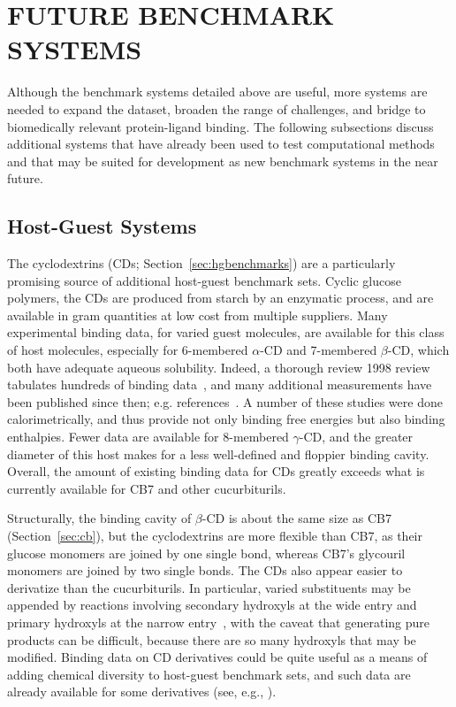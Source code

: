 \documentclass[aps,pre,twocolumn,nofootinbib,superscriptaddress,10pt, final,tightenlines]{revtex4-1}
\begin{document}
\section{FUTURE BENCHMARK SYSTEMS}
\label{sec:futuresystems}
Although the benchmark systems detailed above are useful, more systems are needed to expand the dataset, broaden the range of challenges, and bridge to biomedically relevant protein-ligand binding.
The following subsections discuss additional systems that have already been used to test computational methods and that may be suited for development as new benchmark systems in the near future.

\subsection{Host-Guest Systems}
The cyclodextrins (CDs; Section~\ref{sec:hgbenchmarks}) are a particularly promising source of additional host-guest benchmark sets.
Cyclic glucose polymers, the CDs are produced from starch by an enzymatic process, and are available in gram quantities at low cost from multiple suppliers. 
Many experimental binding data, for varied guest molecules, are available for this class of host molecules, especially for 6-membered $\alpha$-CD and 7-membered $\beta$-CD, which both have adequate aqueous solubility.
Indeed, a thorough review 1998 review tabulates hundreds of binding data~\cite{rekharsky_complexation_1998}, and many additional measurements have been published since then; e.g. references~\cite{Connors:1997:Chem.Rev., Carrazana:2005:J.Phys.Chem.B, Cotner:1998:J.Org.Chem., Wszelaka-Rylik:2013:JThermAnalCalorim,  Shu:2007:BritishJournalofPharmacology, Rodriguez-Perez:2006:J.Pharm.Sci., Mic:2013:AIPConferenceProceedings}.
A number of these studies were done calorimetrically, and thus provide not only binding free energies but also binding enthalpies. 
Fewer data are available for 8-membered $\gamma$-CD, and the greater diameter of this host makes for a less well-defined and floppier binding cavity.
Overall, the amount of existing binding data for CDs greatly exceeds what is currently available for CB7 and other cucurbiturils.

Structurally, the binding cavity of $\beta$-CD is about the same size as CB7 (Section~\ref{sec:cb}), but the cyclodextrins are more flexible than CB7, as their glucose monomers are joined by one single bond, whereas CB7's glycouril monomers are joined by two single bonds.
The CDs also appear easier to derivatize than the cucurbiturils. In particular, varied substituents may be appended by reactions involving secondary hydroxyls at the wide entry and primary hydroxyls at the narrow entry~\cite{Fromming:1994:CyclodextrinsinPharmacy, Dodziuk:2006:, Szente:1999:AdvancedDrugDeliveryReviews, Qu:2002:JournalofInclusionPhenomena, Jindrich:2005:J.Org.Chem.}, with the caveat that generating pure products can be difficult, because there are so many hydroxyls that may be modified. 
Binding data on CD derivatives could be quite useful as a means of adding chemical diversity to host-guest benchmark sets, and such data are already available for some derivatives (see, e.g., \cite{rekharsky_complexation_1998, Faugeras:2012:Eur.J.Org.Chem.}).
\end{document}
